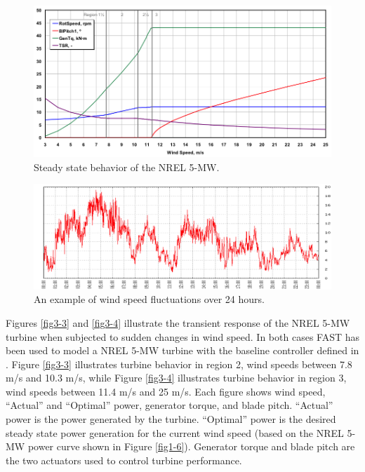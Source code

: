 \begin{figure}[htb]
	\centering
		\includegraphics[width=\linewidth]{Figures/ch2Figures/fig2-1.png}
		
	\caption{Steady state behavior of the NREL 5-MW.\cite{jonkman2009}}
	\label{fig3-1}
\end{figure}

\begin{figure}[htb]
	\centering
		\includegraphics[width=\linewidth]{Figures/ch3Figures/fig3-2.png}
		
	\caption{An example of wind speed fluctuations over 24 hours.\cite{NWTC2013}}
	\label{fig3-2}
\end{figure}

Figures  \ref{fig3-3} and  \ref{fig3-4} illustrate the transient response of the NREL 5-MW turbine when subjected to sudden changes in wind speed. In both cases FAST has been used to model a NREL 5-MW turbine with the baseline controller defined in \cite{jonkman2009}. Figure \ref{fig3-3} illustrates turbine behavior in region 2, wind speeds between 7.8 m/s and 10.3 m/s, while Figure \ref{fig3-4} illustrates turbine behavior in region 3, wind speeds between 11.4 m/s and 25 m/s.  Each figure shows wind speed, ``Actual'' and ``Optimal'' power, generator torque, and blade pitch. ``Actual'' power is the power generated by the turbine. ``Optimal'' power is the desired steady state power generation for the current wind speed (based on the NREL 5-MW power curve shown in Figure \ref{fig1-6}). Generator torque and blade pitch are the two actuators used to control turbine performance. 

